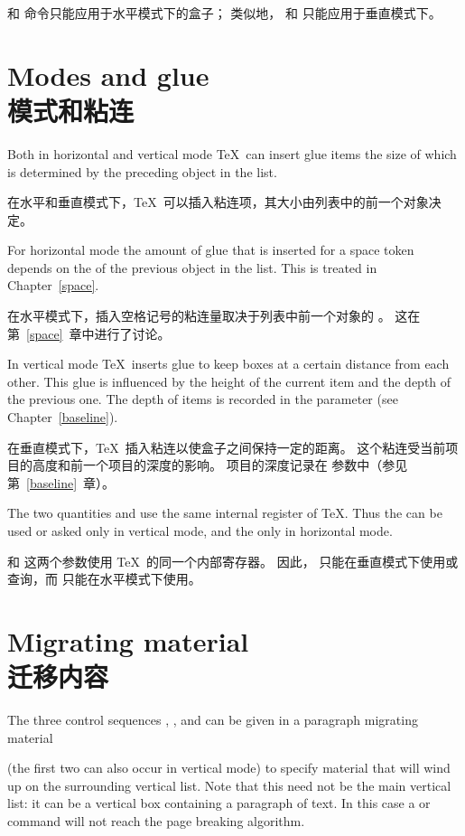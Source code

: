  和  命令只能应用于水平模式下的盒子；
类似地， 和  只能应用于垂直模式下。


\section{Modes and glue\\模式和粘连}

Both in horizontal and vertical mode
\TeX\ can insert glue items the size of which is
determined by the preceding object in the list.

在水平和垂直模式下，\TeX\ 可以插入粘连项，其大小由列表中的前一个对象决定。

For horizontal mode the amount of glue that is inserted
for a space token depends on the  of
the previous object in the list. This is treated
in Chapter~\ref{space}.

在水平模式下，插入空格记号的粘连量取决于列表中前一个对象的 。
这在第~\ref{space}~章中进行了讨论。

In vertical mode \TeX\ inserts glue to keep boxes at a certain
distance from each other. This glue is influenced by the
height of the current item and the depth of the previous one.
The depth of items is recorded in the  parameter
(see Chapter~\ref{baseline}).

在垂直模式下，\TeX\ 插入粘连以使盒子之间保持一定的距离。
这个粘连受当前项目的高度和前一个项目的深度的影响。
项目的深度记录在  参数中（参见第~\ref{baseline}~章）。

The two quantities  
and  
use the same internal register of \TeX. Thus the 
can be used or asked only in vertical mode, and the 
only in horizontal mode.

 和  这两个参数使用 \TeX\ 的同一个内部寄存器。
因此， 只能在垂直模式下使用或查询，而  只能在水平模式下使用。

\section{Migrating material\\迁移内容}
\label{migrate}

The three control sequences , , and 
can be given in a paragraph 
\term migrating material\par
(the first two can also occur
in vertical mode) to specify material that will wind up on the
surrounding vertical list. Note that this need not be 
the main vertical list: it can be a vertical box
containing a paragraph of text. In this case a 
or  command will not reach the page breaking algorithm.

